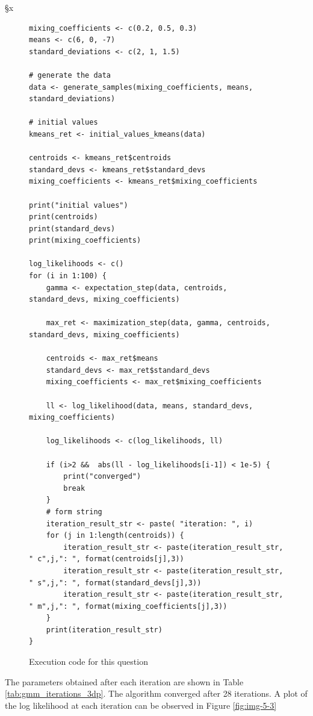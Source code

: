 §x\documentclass[]{article}
\begin{document}
\begin{figure}[H]
	\captionsetup{type=lstlisting}
	\begin{lstlisting}
mixing_coefficients <- c(0.2, 0.5, 0.3)
means <- c(6, 0, -7)
standard_deviations <- c(2, 1, 1.5)

# generate the data
data <- generate_samples(mixing_coefficients, means, standard_deviations)

# initial values
kmeans_ret <- initial_values_kmeans(data)

centroids <- kmeans_ret$centroids
standard_devs <- kmeans_ret$standard_devs
mixing_coefficients <- kmeans_ret$mixing_coefficients

print("initial values")
print(centroids)
print(standard_devs)
print(mixing_coefficients)

log_likelihoods <- c()
for (i in 1:100) {
	gamma <- expectation_step(data, centroids, standard_devs, mixing_coefficients)
	
	max_ret <- maximization_step(data, gamma, centroids, standard_devs, mixing_coefficients)
	
	centroids <- max_ret$means
	standard_devs <- max_ret$standard_devs
	mixing_coefficients <- max_ret$mixing_coefficients 
	
	ll <- log_likelihood(data, means, standard_devs, mixing_coefficients)
	
	log_likelihoods <- c(log_likelihoods, ll)
	
	if (i>2 &&  abs(ll - log_likelihoods[i-1]) < 1e-5) {
		print("converged")
		break
	}
	# form string
	iteration_result_str <- paste( "iteration: ", i)
	for (j in 1:length(centroids)) {
		iteration_result_str <- paste(iteration_result_str, " c",j,": ", format(centroids[j],3))
		iteration_result_str <- paste(iteration_result_str, " s",j,": ", format(standard_devs[j],3))
		iteration_result_str <- paste(iteration_result_str, " m",j,": ", format(mixing_coefficients[j],3))
	}
	print(iteration_result_str)
}			
		\end{lstlisting}
	\caption{Execution code for this question}
\label{lst:em-exec}
\end{figure}


\noindent The parameters obtained after each iteration are shown in Table \ref{tab:gmm_iterations_3dp}. The algorithm converged after 28 iterations. A plot of the log likelihood at each iteration can be observed in Figure \ref{fig:img-5-3}
\end{document}
